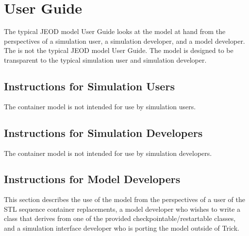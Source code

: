 %
% 

\chapter{User Guide}\label{ch:user}
The typical JEOD model User Guide looks at the model at hand from the
perspectives of a simulation user,
a simulation developer, and a model developer.
The \ModelDesc is not the typical JEOD model User Guide.
The model is designed to be transparent to the typical
simulation user and simulation developer.

\section{Instructions for Simulation Users}
The container model is not intended for use by simulation users.

\section{Instructions for Simulation Developers}
The container model is not intended for use by simulation developers.

\section{Instructions for Model Developers}
This section describes the use of the model from the perspectives of
a user of the STL sequence container replacements,
a model developer who wishes to write a class that derives from
one of the provided checkpointable/restartable classes,
and a simulation interface developer who is porting the model outside of Trick.

